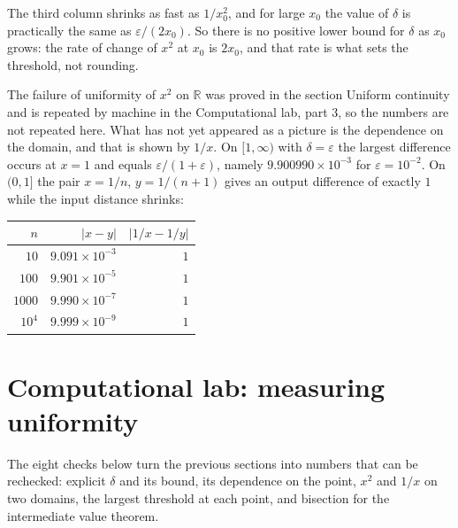The third column shrinks as fast as $1/x_{0}^{2}$, and for large $x_{0}$ the value of
$\delta$ is practically the same as $\varepsilon/(2x_{0})$. So there is no positive lower
bound for $\delta$ as $x_{0}$ grows: the rate of change of $x^{2}$ at $x_{0}$ is $2x_{0}$,
and that rate is what sets the threshold, not rounding.

The failure of uniformity of $x^{2}$ on $\mathbb{R}$ was proved in the section Uniform
continuity and is repeated by machine in the Computational lab, part 3, so the numbers are
not repeated here. What has not yet appeared as a picture is the dependence on the domain,
and that is shown by $1/x$. On $[1,\infty)$ with $\delta=\varepsilon$ the largest
difference occurs at $x=1$ and equals $\varepsilon/(1+\varepsilon)$, namely
$9.900990\times10^{-3}$ for $\varepsilon=10^{-2}$. On $(0,1]$ the pair $x=1/n$,
$y=1/(n+1)$ gives an output difference of exactly $1$ while the input distance shrinks:

\begin{center}
\small
\begin{tabular}{rrr}
\hline
$n$ & $|x-y|$ & $|1/x-1/y|$ \\
\hline
$10$ & $9.091\times10^{-3}$ & $1$ \\
$100$ & $9.901\times10^{-5}$ & $1$ \\
$1000$ & $9.990\times10^{-7}$ & $1$ \\
$10^{4}$ & $9.999\times10^{-9}$ & $1$ \\
\hline
\end{tabular}
\end{center}


\section{Computational lab: measuring uniformity}

The eight checks below turn the previous sections into numbers that can be rechecked:
explicit $\delta$ and its bound, its dependence on the point, $x^{2}$ and $1/x$ on two
domains, the largest threshold at each point, and bisection for the intermediate value
theorem.

